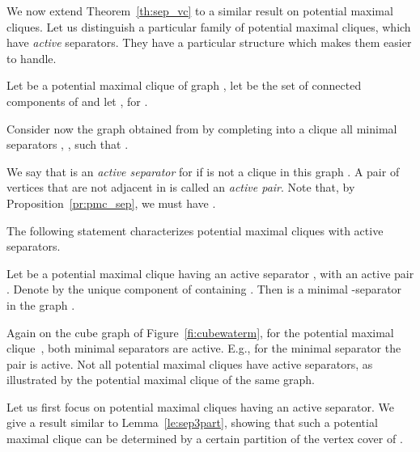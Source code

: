 \documentclass{llncs}
\newcommand{\pmc}{potential maximal clique}
\begin{document}
 


We now extend Theorem~\ref{th:sep_vc} to a similar result on \pmc s. Let us distinguish a particular family of potential maximal cliques, which have \emph{active} separators. They have a particular structure which makes them easier to handle.

\begin{definition}\label{de:active}
Let  be a potential maximal clique of graph , let 
   be the set of 
connected components of  and let , for .

Consider now the graph  obtained from  by completing into a clique all minimal separators , , such that .

We say that  is an \emph{active separator} for  if   is not a clique in this graph . A pair of vertices  that are not adjacent in  is called an \emph{active pair}. Note that, by Proposition~\ref{pr:pmc_sep}, we must have . 
\end{definition}

The following statement characterizes potential maximal cliques with active separators.

\begin{proposition}\label{pr:pmc_active}
Let  be a potential maximal clique having an active separator , with an active pair . Denote by  the unique component of  containing . Then  is a minimal -separator in the graph . 
\end{proposition}

Again on the cube graph of Figure~\ref{fi:cubewaterm}, for the \pmc\ , both minimal separators are active. E.g., for the minimal separator  the pair  is active. Not all potential maximal cliques have active separators, as illustrated by the potential maximal clique  of the same graph.



Let us first focus on potential maximal cliques having an active separator. 
We give a result similar to Lemma~\ref{le:sep3part}, showing that such a potential maximal clique can be determined by a certain partition of the vertex cover  of .
 
\end{document}
